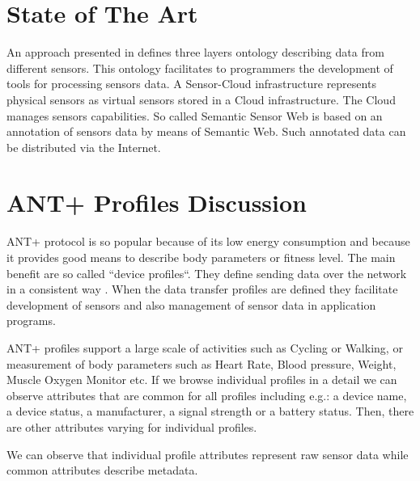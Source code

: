 \documentclass[conference]{IEEEtran}
\begin{document}
\section{State of The Art}\label{sec:state-of-the-art}

An approach presented in \cite{mehmood2014ontology} defines three layers ontology describing data from different sensors. This ontology facilitates to programmers the development of tools for processing sensors data. A Sensor-Cloud infrastructure \cite{5635688} represents physical sensors as virtual sensors stored in a Cloud infrastructure. The Cloud manages sensors capabilities. So called Semantic Sensor Web \cite{4557983} is based on an annotation of sensors data by means of Semantic Web. Such annotated data can be distributed via the Internet.


\section{ANT+ Profiles Discussion}\label{sec:ant-plus-profiles}
ANT+ protocol is so popular because of its low energy consumption and because it provides good means to describe body parameters or fitness level. The main benefit are so called ``device profiles``.  They define sending data over the network in a consistent way \cite{innovations2013ant}. When the data transfer profiles are defined they facilitate development of sensors and also management of sensor data in application programs.

ANT+ profiles support a large scale of activities such as Cycling or Walking, or measurement of body parameters such as Heart Rate, Blood pressure, Weight, Muscle Oxygen Monitor etc. If we browse individual profiles in a detail we can observe attributes that are common for all profiles including e.g.: a device name, a device status, a manufacturer, a signal strength or a battery status. Then, there are other attributes varying for individual profiles. 

We can observe that individual profile attributes represent raw sensor data while common attributes describe metadata. 
\end{document}
